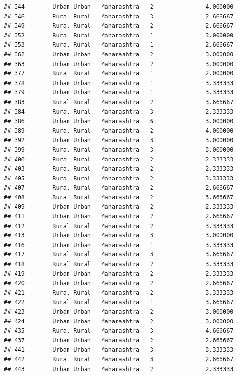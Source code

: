 \documentclass[
]{article}
\begin{document}
\begin{verbatim}
## 344        Urban Urban   Maharashtra   2               4.000000
## 346        Rural Rural   Maharashtra   3               2.666667
## 349        Rural Rural   Maharashtra   2               2.666667
## 352        Rural Rural   Maharashtra   1               3.000000
## 353        Rural Rural   Maharashtra   1               2.666667
## 362        Urban Urban   Maharashtra   2               3.000000
## 363        Urban Urban   Maharashtra   2               3.000000
## 377        Rural Rural   Maharashtra   1               2.000000
## 378        Urban Urban   Maharashtra   1               3.333333
## 379        Urban Urban   Maharashtra   1               3.333333
## 383        Rural Rural   Maharashtra   2               3.666667
## 384        Rural Rural   Maharashtra   3               2.333333
## 386        Urban Urban   Maharashtra   6               3.000000
## 389        Rural Rural   Maharashtra   2               4.000000
## 392        Urban Urban   Maharashtra   3               3.000000
## 399        Rural Rural   Maharashtra   3               3.000000
## 400        Rural Rural   Maharashtra   2               2.333333
## 403        Rural Rural   Maharashtra   2               2.333333
## 405        Rural Rural   Maharashtra   2               3.333333
## 407        Rural Rural   Maharashtra   2               2.666667
## 408        Rural Rural   Maharashtra   2               3.666667
## 409        Urban Urban   Maharashtra   2               2.333333
## 411        Urban Urban   Maharashtra   2               2.666667
## 412        Rural Rural   Maharashtra   2               3.333333
## 413        Urban Urban   Maharashtra   3               3.000000
## 416        Urban Urban   Maharashtra   1               3.333333
## 417        Rural Rural   Maharashtra   3               3.666667
## 418        Rural Rural   Maharashtra   2               3.333333
## 419        Urban Urban   Maharashtra   2               2.333333
## 420        Urban Urban   Maharashtra   2               2.666667
## 421        Rural Rural   Maharashtra   2               3.333333
## 422        Rural Rural   Maharashtra   1               3.666667
## 423        Urban Urban   Maharashtra   2               3.000000
## 424        Urban Urban   Maharashtra   2               3.000000
## 435        Rural Rural   Maharashtra   3               4.666667
## 437        Urban Urban   Maharashtra   2               2.666667
## 441        Urban Urban   Maharashtra   3               3.333333
## 442        Rural Rural   Maharashtra   3               2.666667
## 443        Urban Urban   Maharashtra   2               2.333333

\end{verbatim}
\end{document}
